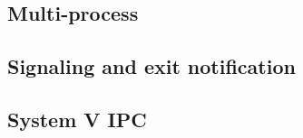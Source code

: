 \begin{comment}
\vspace{5pt}
\noindent{\bf Discussion.~}
A Graphene picoprocess can copy part or all its address space into a child
picoprocess relatively efficiently.
Although this mechanism is less efficient than an in-kernel {\tt fork},
we wanted to maintain the generality benefits of recent \liboses{},
and only added the minimal building blocks to the host ABI.
The transfer of data is explicit to the host, can be mediated by a reference monitor,
the sender, or the receiver.
For instance, recent Unix systems introduced a close-on-exec flag for file handles~\citep{close-on-exec}, 
which prevents inheritance of handles to sensitive files.  This can be implemented
either in a parent, by excluding the file handle from a checkpoint, 
or in the child, by closing this handle on an {\tt exec} call.
Our current implementation implements close-on-exec in the child for complete compatibility,
but a more security-sensitive application could easily implement ``close-on-fork'' semantics 
in the parent.
This clean division of labor retains full functionality
and facilitates extensibility.


\end{comment}



\subsection{Multi-process }




\subsection{Signaling and exit notification}




\subsection{System V IPC}

